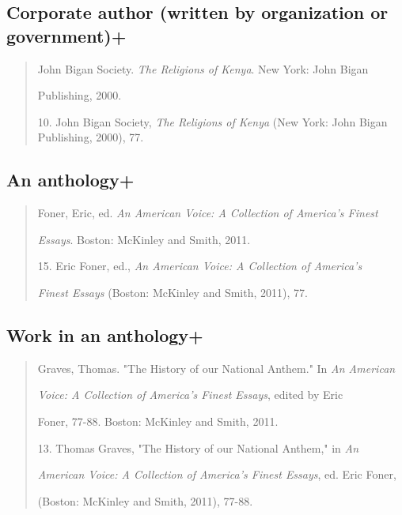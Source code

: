 \subsection{Corporate author (written by organization or government)+}
\begin{quote}

John Bigan Society. \emph{The Religions of Kenya}. New York: John Bigan 

\hspace{.4in}Publishing, 2000.

\medskip

\hspace{.4in}10. John Bigan Society, \emph{The Religions of Kenya} (New York: John Bigan Publishing, 2000), 77.
\end{quote}

\subsection{An anthology+}
\begin{quote}

Foner, Eric, ed. \emph{An American Voice: A Collection of America's Finest}

\hspace{.4in}\emph{Essays}. Boston: McKinley and Smith, 2011.

\medskip

\hspace{.4in}15. Eric Foner, ed., \emph{An American Voice: A Collection of America's}

\emph{Finest Essays} (Boston: McKinley and Smith, 2011), 77.

\end{quote}

\subsection{Work in an anthology+}

\begin{quote}

Graves, Thomas. "The History of our National Anthem." In \emph{An American}

\hspace{.4in}\emph{Voice: A Collection of America's Finest Essays}, edited by Eric

\hspace{.4in}Foner, 77-88. Boston: McKinley and Smith, 2011. 

\medskip

\hspace{.4in}13. Thomas Graves, "The History of our National Anthem," in \emph{An}

\emph{American Voice: A Collection of America's Finest Essays}, ed. Eric Foner,

(Boston: McKinley and Smith, 2011), 77-88.

\end{quote}

